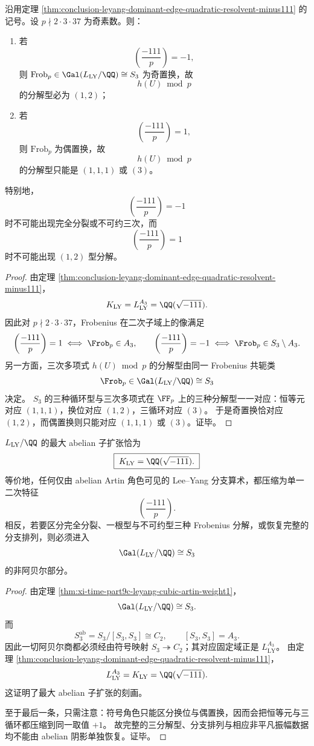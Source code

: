 \begin{corollary}\label{thm:conclusion-leyang-modp-one-root-law-density-thirds}
沿用定理 \ref{thm:conclusion-leyang-dominant-edge-quadratic-resolvent-minus111} 的记号。设 \(p\nmid 2\cdot 3\cdot 37\) 为奇素数。则：
\begin{enumerate}
  \item 若
  \[
  \left(\frac{-111}{p}\right)=-1,
  \]
  则 \(\mathrm{Frob}_p\in \Gal(L_{\mathrm{LY}}/\QQ)\cong S_3\) 为奇置换，故
  \[
  h(U)\bmod p
  \]
  的分解型必为 \((1,2)\)；
  \item 若
  \[
  \left(\frac{-111}{p}\right)=1,
  \]
  则 \(\mathrm{Frob}_p\) 为偶置换，故
  \[
  h(U)\bmod p
  \]
  的分解型只能是 \((1,1,1)\) 或 \((3)\)。
\end{enumerate}
特别地，
\[
\left(\frac{-111}{p}\right)=-1
\]
时不可能出现完全分裂或不可约三次，而
\[
\left(\frac{-111}{p}\right)=1
\]
时不可能出现 \((1,2)\) 型分解。
\end{corollary}
\begin{proof}
由定理 \ref{thm:conclusion-leyang-dominant-edge-quadratic-resolvent-minus111}，
\[
K_{\mathrm{LY}}=L_{\mathrm{LY}}^{A_3}=\QQ(\sqrt{-111}).
\]
因此对 \(p\nmid 2\cdot 3\cdot 37\)，Frobenius 在二次子域上的像满足
\[
\left(\frac{-111}{p}\right)=1
\iff
\Frob_p\in A_3,
\qquad
\left(\frac{-111}{p}\right)=-1
\iff
\Frob_p\in S_3\setminus A_3.
\]
另一方面，三次多项式 \(h(U)\bmod p\) 的分解型由同一 Frobenius 共轭类
\[
\Frob_p\in \Gal(L_{\mathrm{LY}}/\QQ)\cong S_3
\]
决定。
\(S_3\) 的三种循环型与三次多项式在 \(\FF_p\) 上的三种分解型一一对应：恒等元对应 \((1,1,1)\)，换位对应 \((1,2)\)，三循环对应 \((3)\)。
于是奇置换恰对应 \((1,2)\)，而偶置换则只能对应 \((1,1,1)\) 或 \((3)\)。证毕。
\end{proof}

\begin{proposition}\label{prop:conclusion-leyang-abelian-shadow-nonabelian-core}
\(L_{\mathrm{LY}}/\QQ\) 的最大 abelian 子扩张恰为
\[
\boxed{\;
K_{\mathrm{LY}}=\QQ(\sqrt{-111}).\;}
\]
等价地，任何仅由 abelian Artin 角色可见的 Lee--Yang 分支算术，都压缩为单一二次特征
\[
\left(\frac{-111}{p}\right).
\]
相反，若要区分完全分裂、一根型与不可约型三种 Frobenius 分解，或恢复完整的分支排列，则必须进入
\[
\Gal(L_{\mathrm{LY}}/\QQ)\cong S_3
\]
的非阿贝尔部分。
\end{proposition}
\begin{proof}
由定理 \ref{thm:xi-time-part9c-leyang-cubic-artin-weight1}，
\[
\Gal(L_{\mathrm{LY}}/\QQ)\cong S_3.
\]
而
\[
S_3^{\mathrm{ab}}=S_3/[S_3,S_3]\cong C_2,\qquad [S_3,S_3]=A_3.
\]
因此一切阿贝尔商都必须经由符号映射 \(S_3\twoheadrightarrow C_2\)；其对应固定域正是 \(L_{\mathrm{LY}}^{A_3}\)。
由定理 \ref{thm:conclusion-leyang-dominant-edge-quadratic-resolvent-minus111}，
\[
L_{\mathrm{LY}}^{A_3}=K_{\mathrm{LY}}=\QQ(\sqrt{-111}).
\]
这证明了最大 abelian 子扩张的刻画。

至于最后一条，只需注意：符号角色只能区分换位与偶置换，因而会把恒等元与三循环都压缩到同一取值 \(+1\)。
故完整的三分解型、分支排列与相应非平凡振幅数据均不能由 abelian 阴影单独恢复。证毕。
\end{proof}

